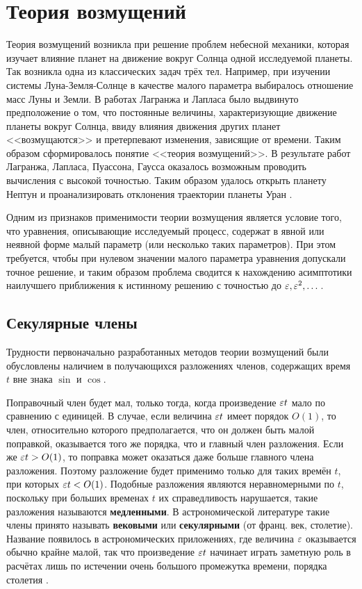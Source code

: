 \chapter*{Теория возмущений}

Теория возмущений возникла при решение
проблем небесной механики,
которая изучает влияние планет
на движение вокруг Солнца одной исследуемой планеты.
Так возникла одна из классических задач трёх тел.
Например, при изучении системы Луна-Земля-Солнце
в качестве малого параметра выбиралось
отношение масс Луны и Земли.
В работах Лагранжа и Лапласа было
выдвинуто предположение о том,
что постоянные величины,
характеризующие движение планеты вокруг Солнца,
ввиду влияния движения других планет <<возмущаются>>
и претерпевают изменения, зависящие от времени.
Таким образом сформировалось понятие <<теория возмущений>>.
В результате работ Лагранжа, Лапласа, Пуассона, Гаусса
оказалось возможным проводить вычисления с высокой точностью.
Таким образом удалось открыть планету Нептун
и проанализировать отклонения траектории планеты Уран \cite{vinogradov1977}.

Одним из признаков применимости теории возмущения
является условие того, что уравнения,
описывающие исследуемый процесс,
содержат в явной или неявной форме малый параметр
(или несколько таких параметров).
При этом требуется, чтобы при нулевом значении
малого параметра уравнения допускали точное решение,
и таким образом проблема сводится к нахождению
асимптотики наилучшего приближения к истинному решению
с точностью до $\varepsilon, \varepsilon^2, \dots$.

\section*{Секулярные члены}

Трудности первоначально разработанных методов теории возмущений
были обусловлены наличием в получающихся разложениях членов,
содержащих время $t$ вне знака $\sin$ и $\cos$.

Поправочный член будет мал,
только тогда, когда произведение $\varepsilon t$
мало по сравнению с единицей.
В случае, если величина $\varepsilon t$
имеет порядок $O(1)$, то член,
относительно которого предполагается,
что он должен быть малой поправкой,
оказывается того же порядка,
что и главный член разложения.
Если же $\varepsilon t > O(1)$,
то поправка может оказаться
даже больше главного члена разложения.
Поэтому разложение будет применимо только
для таких времён $t$, при которых $\varepsilon t < O(1)$.
Подобные разложения являются неравномерными по $t$,
поскольку при больших временах $t$ их справедливость нарушается,
такие разложения называются \textbf{медленными}.
В астрономической литературе такие члены
принято называть \textbf{вековыми} или
\textbf{секулярными} (от франц. век, столетие).
Название появилось в астрономических приложениях,
где величина $\varepsilon$ оказывается обычно крайне малой,
так что произведение $\varepsilon t$ начинает играть
заметную роль в расчётах лишь по истечении
очень большого промежутка времени, порядка столетия
\cite{nayfeh1984}.

